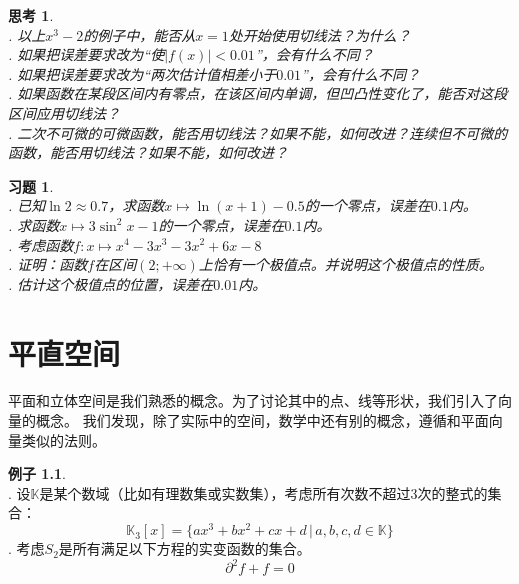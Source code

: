 \documentclass[12pt,UTF8]{ctexbook}
\theoremstyle{definition}
\newtheorem{ex}{例子}[section]
\theoremstyle{plain}
\newtheorem{sk}{思考}[section]
\newtheorem{xt}{习题}[section]
\begin{document}
\begin{sk}
    \mbox{} \\
    . 以上$x^3 - 2$的例子中，能否从$x=1$处开始使用切线法？为什么？\\
    . 如果把误差要求改为“使$|f(x)| < 0.01$”，会有什么不同？\\
    . 如果把误差要求改为“两次估计值相差小于$0.01$”，会有什么不同？\\
    . 如果函数在某段区间内有零点，在该区间内单调，但凹凸性变化了，能否对这段区间应用切线法？\\
    . 二次不可微的可微函数，能否用切线法？如果不能，如何改进？连续但不可微的函数，能否用切线法？如果不能，如何改进？
\end{sk}

\begin{xt}
    \mbox{} \\
    . 已知$\ln{2} \approx 0.7$，求函数$x\mapsto \ln{(x+1)} - 0.5$的一个零点，误差在$0.1$内。\\
    . 求函数$x\mapsto 3\sin^2{x} - 1$的一个零点，误差在$0.1$内。\\
    . 考虑函数$f:x\mapsto x^4-3 x^3-3 x^2+6 x-8$ \\
    . 证明：函数$f$在区间$(2;+\infty)$上恰有一个极值点。并说明这个极值点的性质。\\
    . 估计这个极值点的位置，误差在$0.01$内。
\end{xt}


\chapter{平直空间}
平面和立体空间是我们熟悉的概念。为了讨论其中的点、线等形状，我们引入了向量的概念。
我们发现，除了实际中的空间，数学中还有别的概念，遵循和平面向量类似的法则。

\begin{ex}
    \mbox{} \\
    . 设$\mathbb{K}$是某个数域（比如有理数集或实数集），考虑所有次数不超过$3$次的整式的集合：
    $$\mathbb{K}_3[x] = \{ax^3 + bx^2 + cx + d \, | \, a, b, c, d \in \mathbb{K}\}$$
    . 考虑$S_2$是所有满足以下方程的实变函数的集合。
    $$ \partial^2 f + f = 0$$
\end{ex}
\end{document}
